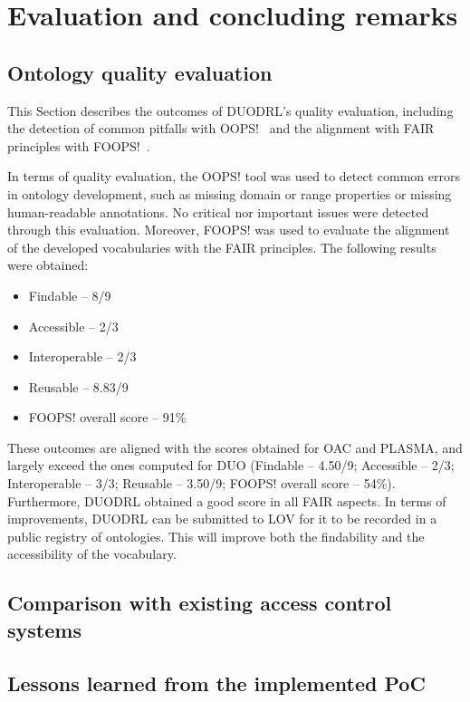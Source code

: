 \section{Evaluation and concluding remarks}
\label{sec:evaluation_conclusions}

\subsection{Ontology quality evaluation}
\label{sec:ontology_evaluation}

This Section describes the outcomes of DUODRL's quality evaluation, including the detection of common pitfalls with OOPS!~\citep{poveda-villalon_oops_2014} and the alignment with FAIR principles with FOOPS!~\citep{garijo_foops_2021}. 

In terms of quality evaluation, the OOPS! tool was used to detect common errors in ontology development, such as missing domain or range properties or missing human-readable annotations.
No critical nor important issues were detected through this evaluation.
Moreover, FOOPS! was used to evaluate the alignment of the developed vocabularies with the FAIR principles.
The following results were obtained:
\begin{itemize}
    \item Findable -- 8/9
    \item Accessible -- 2/3
    \item Interoperable -- 2/3
    \item Reusable -- 8.83/9
    \item FOOPS! overall score -- 91\%
\end{itemize}
These outcomes are aligned with the scores obtained for OAC and PLASMA, and largely exceed the ones computed for DUO (Findable -- 4.50/9; Accessible -- 2/3; Interoperable -- 3/3; Reusable -- 3.50/9; FOOPS! overall score -- 54\%).
Furthermore, DUODRL obtained a good score in all FAIR aspects.
In terms of improvements, DUODRL can be submitted to LOV for it to be recorded in a public registry of ontologies.
This will improve both the findability and the accessibility of the vocabulary.

\subsection{Comparison with existing access control systems}
\label{sec:comparison_evaluation}

\subsection{Lessons learned from the implemented PoC}
\label{sec:conclusions_poc}